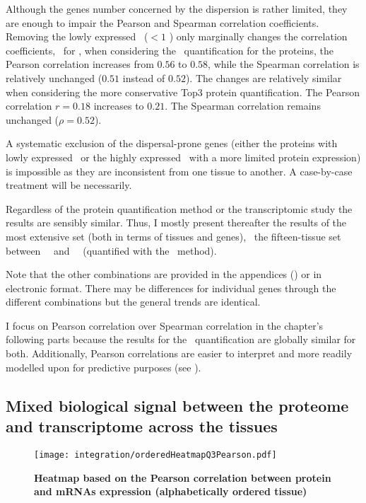 Although the genes number concerned by the dispersion is rather limited,
they are enough to impair the Pearson and Spearman correlation coefficients.
Removing the lowly expressed \mRNAs\ ($<1$ \FPKM) only marginally changes
the correlation coefficients,
\eg\ for \kidney,
when considering the \PPKM\ quantification for the proteins,
the Pearson correlation
increases from $0.56$ to $0.58$,
while the Spearman correlation is relatively unchanged
($0.51$ instead of $0.52$).
The changes are relatively similar
when considering the more conservative Top3 protein quantification.
The Pearson correlation $r=0.18$ increases to $0.21$.
The Spearman correlation remains unchanged ($\rho=0.52$).

A systematic exclusion of the dispersal-prone genes
(either the proteins with lowly expressed \mRNAs\
or the highly expressed \mRNAs\ with a more limited protein expression)
is impossible
as they are inconsistent from one tissue to another.\label{memo:dispersedGenes}
A case-by-case treatment will be necessarily.

Regardless of the protein quantification method or
the transcriptomic study %
the results are sensibly similar.
Thus, I mostly present thereafter the results of the most extensive set
(both in terms of tissues and genes),
\ie\ the fifteen-tissue set between \uhlen\ \etal\ and \pandey\ \etal\
(quantified with the \PPKM\ method).

Note that the other combinations are provided
in the appendices ()
or in electronic format.
There may be differences for individual genes through the different combinations
but the general trends are identical.

I focus on Pearson correlation over Spearman correlation\label{seg:pearOverSpear}
in the chapter's following parts
because the results for the \PPKM\ quantification are globally similar for both.
Additionally, Pearson correlations are easier to interpret
and more readily modelled upon for predictive purposes
(see \Cref{subsec:PearsonVsSpearman}).

\subsection{Mixed biological signal between the proteome and transcriptome
across the tissues}

\begin{figure}[!hbt]
    \texttt{[image: integration/orderedHeatmapQ3Pearson.pdf]}\centering
    \vspace{-3mm}
    \caption[Heatmap based on the Pearson correlation between protein and mRNAs
    expression (alphabetically ordered tissue)]{\label{fig:orderedHeatmapPearson}%
    \textbf{Heatmap based on the Pearson correlation between protein and mRNAs
    expression (alphabetically ordered tissue)}}
\end{figure}

